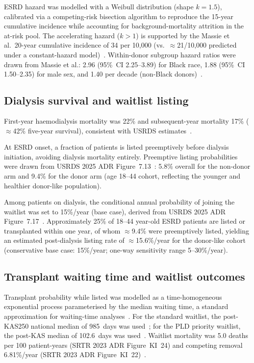 ESRD hazard was modelled with a Weibull distribution (shape $k = 1.5$), calibrated via a competing-risk bisection algorithm to reproduce the 15-year cumulative incidence while accounting for background-mortality attrition in the at-risk pool. The accelerating hazard ($k > 1$) is supported by the Massie et al.\ 20-year cumulative incidence of 34 per 10,000 (vs.\ $\approx$21/10,000 predicted under a constant-hazard model)~\cite{massie_quantifying_2017}. Within-donor subgroup hazard ratios were drawn from Massie et al.: 2.96 (95\%~CI 2.25--3.89) for Black race, 1.88 (95\%~CI 1.50--2.35) for male sex, and 1.40 per decade (non-Black donors)~\cite{massie_quantifying_2017}.

\subsection{Dialysis survival and waitlist listing}
First-year haemodialysis mortality was 22\% and subsequent-year mortality 17\% ($\approx$42\% five-year survival), consistent with USRDS estimates~\cite{usrds_2024}.

At ESRD onset, a fraction of patients is listed preemptively before dialysis initiation, avoiding dialysis mortality entirely. Preemptive listing probabilities were drawn from USRDS 2025 ADR Figure~7.13~\cite{usrds_2025}: 5.8\% overall for the non-donor arm and 9.4\% for the donor arm (age 18--44 cohort, reflecting the younger and healthier donor-like population).

Among patients on dialysis, the conditional annual probability of joining the waitlist was set to 15\%/year (base case), derived from USRDS 2025 ADR
Figure~7.17~\cite{usrds_2025}. Approximately 25\% of 18--44 year-old ESRD patients are listed or transplanted within one year, of whom $\approx$9.4\% were preemptively listed, yielding an estimated post-dialysis listing rate of $\approx$15.6\%/year for the donor-like cohort (conservative base case: 15\%/year; one-way sensitivity range 5--30\%/year).

\subsection{Transplant waiting time and waitlist outcomes}
Transplant probability while listed was modelled as a time-homogeneous exponential process parameterised by the median waiting time, a standard approximation for waiting-time analyses~\cite{krahn_primer_1997}. For the standard waitlist, the post-KAS250 national median of 985~days was used~\cite{schold_effect_2023}; for the PLD priority waitlist, the post-KAS median of 102.6~days was used~\cite{wainright_impact_2017}. Waitlist mortality was 5.0 deaths per 100 patient-years (SRTR 2023 ADR Figure~KI~24) and competing removal 6.81\%/year (SRTR 2023 ADR
Figure~KI~22)~\cite{srtr_2023}.

